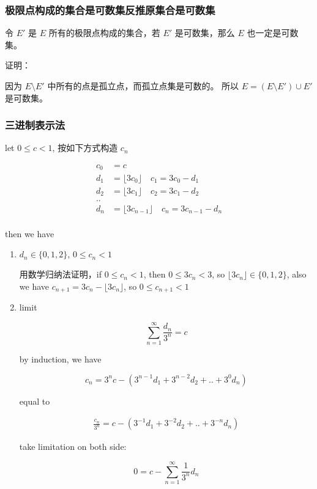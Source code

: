 \documentclass[12pt,a4paper]{ctexart}
\begin{document}
\subsubsection{极限点构成的集合是可数集反推原集合是可数集}

令 $E'$ 是 $E$ 所有的极限点构成的集合，若 $E'$ 是可数集，那么 $E $ 也一定是可数集。

证明：

因为 $E \setminus E'$ 中所有的点是孤立点，而孤立点集是可数的。
所以 $E = (E \setminus E') \cup E'$ 是可数集。

\subsubsection{三进制表示法}

let $0 \le c < 1$, 按如下方式构造 $c_n$

\begin{align*}
    c_0 &= c \\
    d_1 &= \lfloor 3c_0 \rfloor \quad c_1 = 3c_0 - d_1 \\
    d_2 &= \lfloor 3c_1 \rfloor \quad c_2 = 3c_1 - d_2 \\
    .. \\
    d_n &= \lfloor 3c_{n-1} \rfloor \quad c_n = 3c_{n-1} - d_n \\
\end{align*}

then we have 

\begin{enumerate}
    \item $d_n \in \{ 0,1,2 \},\, 0 \le c_n < 1$

    用数学归纳法证明，if $0 \le c_n < 1$, then $0 \le 3c_n <3$, so $ \lfloor 3c_n \rfloor \in \{ 0,1,2 \}$, also we have
    $c_{n+1} = 3c_{n} - \lfloor 3c_n\rfloor$, so $0 \le c_{n+1} < 1$


    \item limit

    \[
        \sum_{n=1}^{\infty} \frac{d_n}{3^n} = c
    \]

    by induction, we have

    \[
        c_n = 3^n c - (3^{n-1}d_1 + 3^{n-2}d_2 + .. + 3^{0}d_n)
    \]

    equal to

    \begin{align*}
        \frac{c_n}{3^n} = c - (3^{-1}d_1 + 3^{-2}d_2 + .. + 3^{-n}d_n)
    \end{align*}

    take limitation on both side:

    \[
        0 = c - \sum_{n=1}^{\infty}\frac{1}{3^n} d_n
    \]
\end{enumerate}
\end{document}
